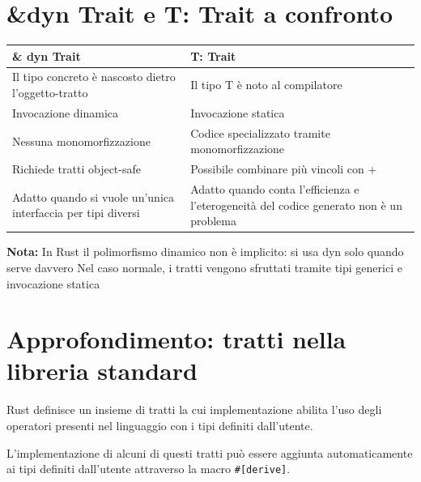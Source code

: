 \section{\&dyn Trait e T: Trait a confronto}

\begin{table}[h!]
  \renewcommand{\arraystretch}{1.5}
  \centering
  \begin{tabularx}{\textwidth}{X X}
    \hline
    \textbf{\& dyn Trait}                                        & \textbf{T: Trait}                                                                       \\
    \hline
    Il tipo concreto è nascosto dietro l'oggetto-tratto          & Il tipo T è noto al compilatore                                                         \\
    Invocazione dinamica                                         & Invocazione statica                                                                     \\
    Nessuna monomorfizzazione                                    & Codice specializzato tramite monomorfizzazione                                          \\
    Richiede tratti object-safe                                  & Possibile combinare più vincoli con +                                                   \\
    Adatto quando si vuole un'unica interfaccia per tipi diversi & Adatto quando conta l'efficienza e l'eterogeneità del codice generato non è un problema \\
    \hline
  \end{tabularx}
\end{table}


\begin{tcolorbox}
  \textbf{Nota:} In Rust il polimorfismo dinamico non è implicito: si usa dyn solo quando serve davvero
  Nel caso normale, i tratti vengono sfruttati tramite tipi generici e invocazione statica
\end{tcolorbox}

\section{Approfondimento: tratti nella libreria standard}

Rust definisce un insieme di tratti la cui implementazione abilita l'uso degli
operatori presenti nel linguaggio con i tipi definiti dall'utente.

L'implementazione di alcuni di questi tratti può essere aggiunta automaticamente
ai tipi definiti dall'utente attraverso la macro \verb|#[derive]|.


